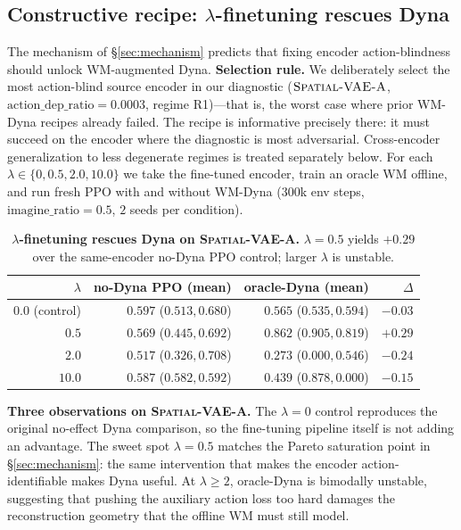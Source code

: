 \documentclass{article}
\newcommand{\srcVA}{\textsc{Spatial-VAE-A}}
\begin{document}
\subsection{Constructive recipe: $\lambda$-finetuning rescues Dyna}\label{sec:recipe}

The mechanism of \S\ref{sec:mechanism} predicts that fixing encoder action-blindness should unlock WM-augmented Dyna. \textbf{Selection rule.} We deliberately select the most action-blind source encoder in our diagnostic ($\srcVA$, $\mathrm{action\_dep\_ratio} = 0.0003$, regime R1)---that is, the worst case where prior WM-Dyna recipes already failed. The recipe is informative precisely there: it must succeed on the encoder where the diagnostic is most adversarial. Cross-encoder generalization to less degenerate regimes is treated separately below. For each $\lambda \in \{0, 0.5, 2.0, 10.0\}$ we take the fine-tuned encoder, train an oracle WM offline, and run fresh PPO with and without WM-Dyna ($300$k env steps, $\mathrm{imagine\_ratio}{=}0.5$, $2$ seeds per condition).

\begin{table}[h]
  \centering
  \small
  \caption{\textbf{$\lambda$-finetuning rescues Dyna on \srcVA.} $\lambda{=}0.5$ yields $\mathbf{+0.29}$ over the same-encoder no-Dyna PPO control; larger $\lambda$ is unstable.}
  \label{tab:phase-T}
  \begin{tabular}{r r r r}
    \toprule
    $\lambda$ & no-Dyna PPO (mean) & oracle-Dyna (mean) & $\Delta$ \\
    \midrule
    $0.0$ (control) & $0.597$ ($0.513, 0.680$) & $0.565$ ($0.535, 0.594$) & $-0.03$ \\
    $0.5$           & $0.569$ ($0.445, 0.692$) & $\mathbf{0.862}$ ($0.905, 0.819$) & $\mathbf{+0.29}$ \\
    $2.0$           & $0.517$ ($0.326, 0.708$) & $0.273$ ($\mathbf{0.000}, 0.546$) & $-0.24$ \\
    $10.0$          & $0.587$ ($0.582, 0.592$) & $0.439$ ($0.878, \mathbf{0.000}$) & $-0.15$ \\
    \bottomrule
  \end{tabular}
\end{table}

\textbf{Three observations on \srcVA.} The $\lambda{=}0$ control reproduces the original no-effect Dyna comparison, so the fine-tuning pipeline itself is not adding an advantage. The sweet spot $\lambda{=}0.5$ matches the Pareto saturation point in \S\ref{sec:mechanism}: the same intervention that makes the encoder action-identifiable makes Dyna useful. At $\lambda\geq2$, oracle-Dyna is bimodally unstable, suggesting that pushing the auxiliary action loss too hard damages the reconstruction geometry that the offline WM must still model.
\end{document}
